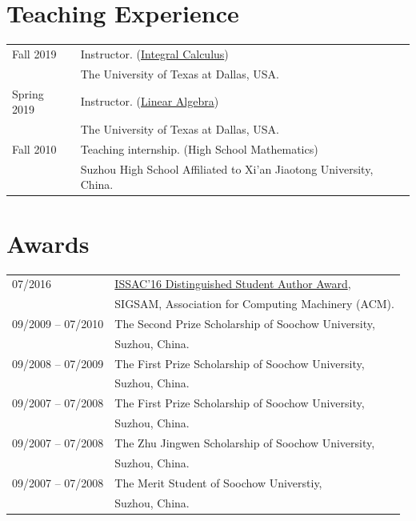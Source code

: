 \documentclass[a4paper,12pt]{article}
\begin{document}
\section*{\Large{Teaching Experience}}
\begin{tabular}{@{}p{1.4in}p{4in}} 
Fall 2019 & Instructor. (\href{https://yzhang1616.github.io/calculus19fall/calculus.html}{Integral Calculus}) \\
             & The University of Texas at Dallas, USA.   \\
Spring 2019           & Instructor. (\href{https://yzhang1616.github.io/algebra19spring/algebra.html}{Linear Algebra}) \\
                      & The University of Texas at Dallas, USA. \\
Fall 2010             & Teaching internship. (High School Mathematics) \\
                      & Suzhou High School Affiliated to Xi'an Jiaotong University, China.                        
\end{tabular}


\section*{\Large{Awards}}
\begin{tabular}{@{}p{1.4in}p{4in}}
07/2016               & \href{https://www.sigsam.org/Awards/ISSACAwards.html}{ISSAC'16 Distinguished Student Author Award}, \\
                      & SIGSAM, Association for Computing Machinery (ACM). \\
09/2009 -- 07/2010    & The Second Prize Scholarship of Soochow University, \\ 
                      & Suzhou, China.\\
09/2008 -- 07/2009    & The First Prize Scholarship of Soochow University, \\ 
                      & Suzhou, China.\\
09/2007 -- 07/2008    & The First Prize Scholarship of Soochow University, \\ 
                      & Suzhou, China.\\
09/2007 -- 07/2008    & The Zhu Jingwen Scholarship of Soochow University, \\ 
                      & Suzhou, China.\\
09/2007 -- 07/2008    & The Merit Student of Soochow Universtiy, \\ 
                      & Suzhou, China.\\
\end{tabular}
\end{document}
